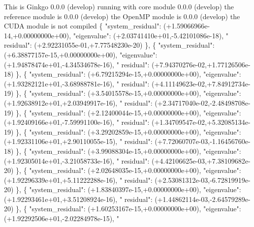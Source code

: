 \begin{DoxyCode}
This is Ginkgo 0.0.0 (develop)
    running with core module 0.0.0 (develop)
    the reference module is  0.0.0 (develop)
    the OpenMP    module is  0.0.0 (develop)
    the CUDA      module is  not compiled
\{ \textcolor{stringliteral}{"system\_residual"}: (+1.59066966e-14,+0.00000000e+00), \textcolor{stringliteral}{"eigenvalue"}: (+2.03741410e+01,-5.42101086e-18), \textcolor{stringliteral}{"
      residual"}: (+2.92231055e-01,+7.77548230e-20) \},
\{ \textcolor{stringliteral}{"system\_residual"}: (+6.38877157e-15,+0.00000000e+00), \textcolor{stringliteral}{"eigenvalue"}: (+1.94878474e+01,-4.34534678e-16), \textcolor{stringliteral}{"
      residual"}: (+7.94370276e-02,+1.77126506e-18) \},
\{ \textcolor{stringliteral}{"system\_residual"}: (+6.79215294e-15,+0.00000000e+00), \textcolor{stringliteral}{"eigenvalue"}: (+1.93282121e+01,-3.68988781e-16), \textcolor{stringliteral}{"
      residual"}: (+4.11149623e-02,+7.84912734e-19) \},
\{ \textcolor{stringliteral}{"system\_residual"}: (+3.54015578e-15,+0.00000000e+00), \textcolor{stringliteral}{"eigenvalue"}: (+1.92638912e+01,+2.03949917e-16), \textcolor{stringliteral}{"
      residual"}: (+2.34717040e-02,-2.48498708e-19) \},
\{ \textcolor{stringliteral}{"system\_residual"}: (+2.12400044e-15,+0.00000000e+00), \textcolor{stringliteral}{"eigenvalue"}: (+1.92409166e+01,-7.59991100e-16), \textcolor{stringliteral}{"
      residual"}: (+1.34709547e-02,+5.32085134e-19) \},
\{ \textcolor{stringliteral}{"system\_residual"}: (+3.29202859e-15,+0.00000000e+00), \textcolor{stringliteral}{"eigenvalue"}: (+1.92331106e+01,+2.90110055e-15), \textcolor{stringliteral}{"
      residual"}: (+7.72060707e-03,-1.16456760e-18) \},
\{ \textcolor{stringliteral}{"system\_residual"}: (+3.99088304e-15,+0.00000000e+00), \textcolor{stringliteral}{"eigenvalue"}: (+1.92305014e+01,-3.21058733e-16), \textcolor{stringliteral}{"
      residual"}: (+4.42106625e-03,+7.38109682e-20) \},
\{ \textcolor{stringliteral}{"system\_residual"}: (+2.02648035e-15,+0.00000000e+00), \textcolor{stringliteral}{"eigenvalue"}: (+1.92296339e+01,+5.11222288e-16), \textcolor{stringliteral}{"
      residual"}: (+2.53081312e-03,-6.72819919e-20) \},
\{ \textcolor{stringliteral}{"system\_residual"}: (+1.83840397e-15,+0.00000000e+00), \textcolor{stringliteral}{"eigenvalue"}: (+1.92293461e+01,+3.51208924e-16), \textcolor{stringliteral}{"
      residual"}: (+1.44862114e-03,-2.64579289e-20) \},
\{ \textcolor{stringliteral}{"system\_residual"}: (+1.60253167e-15,+0.00000000e+00), \textcolor{stringliteral}{"eigenvalue"}: (+1.92292506e+01,-2.02284978e-15), \textcolor{stringliteral}{"
}
\end{DoxyCode}
